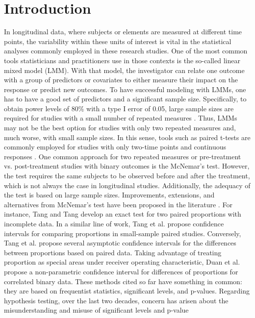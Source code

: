 \documentclass[AMA,Times1COL]{WileyNJDv5} %
\begin{document}
\renewcommand\thefootnote{}

\renewcommand\thefootnote{\fnsymbol{footnote}}
\setcounter{footnote}{1}


\section{Introduction}

In longitudinal data, where subjects or elements are measured at different time points, the variability within these units of interest is vital in the statistical analyses commonly employed in these research studies. One of the most common tools statisticians and practitioners use in those contexts is the so-called linear mixed model (LMM). With that model, the investigator can relate one outcome with a group of predictors or covariates to either measure their impact on the response or predict new outcomes. To have successful modeling with LMMs, one has to have a good set of predictors and a significant sample size. Specifically, to obtain power levels of 80\% with a type I error of 0.05, large sample sizes are required for studies with a small number of repeated measures \cite{dang2008sample}. Thus, LMMs may not be the best option for studies with only two repeated measures and, much worse, with small sample sizes. In this sense, tools such as paired t-tests are commonly employed for studies with only two-time points and continuous responses \cite{diehr1995breaking, brookmeyer1998person, duncan2013self, chen2014comparison, forrester2015selecting, manfei2017differences, cowdery2019effectiveness, albassam2021testing}. One common approach for two repeated measures or pre-treatment vs. post-treatment studies with binary outcomes is the McNemar's test\cite{mcnemar1947note}. However, the test requires the same subjects to be observed before and after the treatment, which is not always the case in longitudinal studies. Additionally, the adequacy of the test is based on large sample sizes. Improvements, extensions, and alternatives from McNemar's test have been proposed in the literature \citep{ lu1995sample, morikawa19952chi, tango1998equivalence}. For instance, Tang and Tang\cite{tang2004exact} develop an exact test for two paired proportions with incomplete data. In a similar line of work, Tang et al. \cite{tang2005confidence} propose confidence intervals for comparing proportions in small-sample paired studies. Conversely, Tang et al. \cite{tang2010confidence} propose several asymptotic confidence intervals for the differences between proportions based on paired data. Taking advantage of treating proportion as special areas under receiver operating characteristic, Duan et al. \cite{duan2018novel} propose a non-parametric confidence interval for differences of proportions for correlated binary data. These methods cited so far have something in common: they are based on frequentist statistics, significant levels, and p-values. Regarding hypothesis testing, over the last two decades, concern has arisen about the misunderstanding and misuse of significant levels and p-value 
\end{document}
